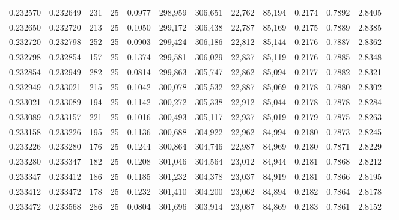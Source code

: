 \begin{tabular}{rrrrrrrrrrrrr}
0.232570 & 0.232649 &   231 &  25 &                                     0.0977 & 298,959 & 306,651 &  22,762 &  85,194 & 0.2174 & 0.7892 & 2.8405 \\
0.232650 & 0.232720 &   213 &  25 &                                     0.1050 & 299,172 & 306,438 &  22,787 &  85,169 & 0.2175 & 0.7889 & 2.8385 \\
0.232720 & 0.232798 &   252 &  25 &                                     0.0903 & 299,424 & 306,186 &  22,812 &  85,144 & 0.2176 & 0.7887 & 2.8362 \\
0.232798 & 0.232854 &   157 &  25 &                                     0.1374 & 299,581 & 306,029 &  22,837 &  85,119 & 0.2176 & 0.7885 & 2.8348 \\
0.232854 & 0.232949 &   282 &  25 &                                     0.0814 & 299,863 & 305,747 &  22,862 &  85,094 & 0.2177 & 0.7882 & 2.8321 \\
0.232949 & 0.233021 &   215 &  25 &                                     0.1042 & 300,078 & 305,532 &  22,887 &  85,069 & 0.2178 & 0.7880 & 2.8302 \\
0.233021 & 0.233089 &   194 &  25 &                                     0.1142 & 300,272 & 305,338 &  22,912 &  85,044 & 0.2178 & 0.7878 & 2.8284 \\
0.233089 & 0.233157 &   221 &  25 &                                     0.1016 & 300,493 & 305,117 &  22,937 &  85,019 & 0.2179 & 0.7875 & 2.8263 \\
0.233158 & 0.233226 &   195 &  25 &                                     0.1136 & 300,688 & 304,922 &  22,962 &  84,994 & 0.2180 & 0.7873 & 2.8245 \\
0.233226 & 0.233280 &   176 &  25 &                                     0.1244 & 300,864 & 304,746 &  22,987 &  84,969 & 0.2180 & 0.7871 & 2.8229 \\
0.233280 & 0.233347 &   182 &  25 &                                     0.1208 & 301,046 & 304,564 &  23,012 &  84,944 & 0.2181 & 0.7868 & 2.8212 \\
0.233347 & 0.233412 &   186 &  25 &                                     0.1185 & 301,232 & 304,378 &  23,037 &  84,919 & 0.2181 & 0.7866 & 2.8195 \\
0.233412 & 0.233472 &   178 &  25 &                                     0.1232 & 301,410 & 304,200 &  23,062 &  84,894 & 0.2182 & 0.7864 & 2.8178 \\
0.233472 & 0.233568 &   286 &  25 &                                     0.0804 & 301,696 & 303,914 &  23,087 &  84,869 & 0.2183 & 0.7861 & 2.8152 \\

\end{tabular}
